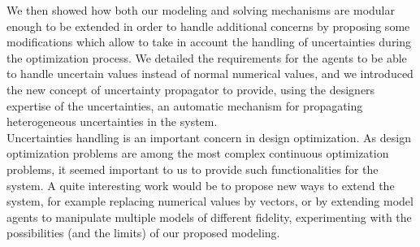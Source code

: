 We then showed how both our modeling and solving mechanisms are modular enough to be extended in order to handle additional concerns by proposing some modifications which allow to take in account the handling of uncertainties during the optimization process. We detailed the requirements for the agents to be able to handle uncertain values instead of normal numerical values, and we introduced the new concept of uncertainty propagator to provide, using the designers expertise of the uncertainties, an automatic mechanism for propagating heterogeneous uncertainties in the system.
\\
Uncertainties handling is an important concern in design optimization. As design optimization problems are among the most complex continuous optimization problems, it seemed important to us to provide such functionalities for the system. A quite interesting work would be to propose new ways to extend the system, for example replacing numerical values by vectors, or by extending model agents to manipulate multiple models of different fidelity, experimenting with the possibilities (and the limits) of our proposed modeling.
